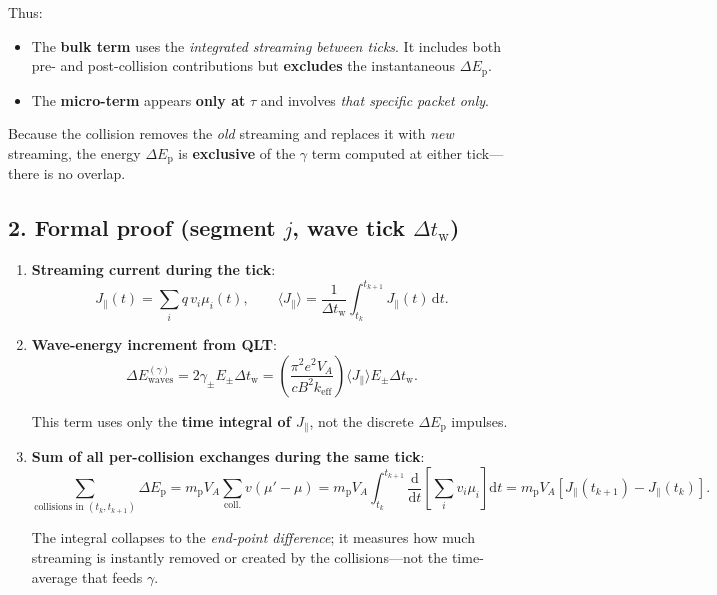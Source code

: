 {\noindent Thus:
\begin{itemize}
  \item The \textbf{bulk term} uses the \emph{integrated streaming between ticks}. It includes both pre- and post-collision contributions but \textbf{excludes} the instantaneous $\Delta E_{\mathrm p}$.
  \item The \textbf{micro-term} appears \textbf{only at} $\tau$ and involves \emph{that specific packet only}.
\end{itemize}

Because the collision removes the \emph{old} streaming and replaces it with \emph{new} streaming, the energy $\Delta E_{\mathrm p}$ is \textbf{exclusive} of the $\gamma$ term computed at either tick—there is no overlap.

\subsection*{2. Formal proof (segment $j$, wave tick $\Delta t_{\mathrm w}$)}

\begin{enumerate}
\item \textbf{Streaming current during the tick}:
\[
J_\parallel(t) = \sum_i q\,v_i \mu_i(t),
\qquad
\langle J_\parallel \rangle = \frac{1}{\Delta t_{\mathrm w}} \int_{t_k}^{t_{k+1}} J_\parallel(t)\,\mathrm{d}t.
\]

\item \textbf{Wave-energy increment from QLT}:
\[
\Delta E_{\mathrm{waves}}^{(\gamma)} = 2\gamma_\pm E_\pm \Delta t_{\mathrm w}
= \left( \frac{\pi^2 e^2 V_A}{c B^2 k_{\mathrm{eff}}} \right)
\langle J_\parallel \rangle E_\pm \Delta t_{\mathrm w}.
\]

This term uses only the \textbf{time integral of $J_\parallel$}, not the discrete $\Delta E_{\mathrm p}$ impulses.

\item \textbf{Sum of all per-collision exchanges during the same tick}:
\[
\sum_{\text{collisions in } (t_k, t_{k+1})} \Delta E_{\mathrm p}
= m_{\mathrm p} V_A \sum_{\text{coll.}} v(\mu' - \mu)
= m_{\mathrm p} V_A \int_{t_k}^{t_{k+1}} \frac{\mathrm{d}}{\mathrm{d}t}
\left[\sum_i v_i \mu_i\right] \mathrm{d}t
= m_{\mathrm p} V_A \left[ J_\parallel(t_{k+1}) - J_\parallel(t_k) \right].
\]

The integral collapses to the \emph{end-point difference}; it measures how much streaming is instantly removed or created by the collisions—not the time-average that feeds $\gamma$.


\end{enumerate}}
